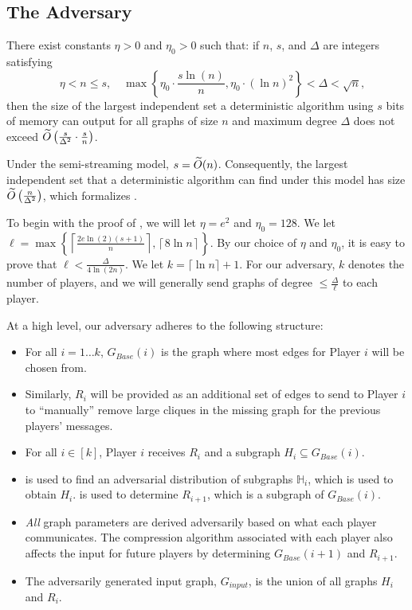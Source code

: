 \documentclass[11pt]{article}
\begin{document}
\subsection{The Adversary}

\begin{theorem}\label{main-theorem}
    There exist constants $\eta>0$ and $\eta_0>0$ such that: if $n$, $s$, and $\Delta$ are integers satisfying
    \[ \quad \eta<n\le s, \quad \max\left\{\eta_0\cdot \frac{s\ln(n)}n, \eta_0\cdot {(\ln n)}^2 \right \}< \Delta < \sqrt n,\]
    then the size of the largest independent set a deterministic algorithm using $s$ bits of memory can output for all graphs of size $n$ and maximum degree $\Delta$ does not exceed $\widetilde{O}\left(\frac s{\Delta^2}\cdot \frac sn\right)$. 
\end{theorem}

Under the semi-streaming model, $s=\widetilde{O}(n)$. Consequently, the largest independent set that a deterministic algorithm can find under this model has size $\widetilde{O}\left(\frac n{\Delta^2}\right)$, which formalizes .

\newcommand{\distribFac}{\ell}

To begin with the proof of , we will let $\eta=e^2$ and $\eta_0=128$. We let ${\distribFac}=\max\left\{\left\lceil\frac{2e\ln(2)(s+1)}n \right\rceil, \left\lceil8\ln n\right\rceil\right\}$. By our choice of $\eta$ and $\eta_0$, it is easy to prove that ${\distribFac}<\frac{\Delta}{4\ln(2n)}$. We let $k=\lceil \ln n\rceil +1$. For our adversary, $k$ denotes the number of players, and we will generally send graphs of degree $\le \frac{\Delta}{\distribFac}$ to each player. 

At a high level, our adversary adheres to the following structure:
\begin{itemize}
    \item For all $i=1\dots k$, $G_{Base}(i)$ is the graph where most edges for Player $i$ will be chosen from.
    \item Similarly, $R_i$ will be provided as an additional set of edges to send to Player $i$ to ``manually'' remove large cliques in the missing graph for the previous players' messages. 
    \item For all $i\in [k]$, Player $i$ receives $R_i$ and a subgraph $H_i\subseteq G_{Base}(i)$. 
    \item {} is used to find an adversarial distribution of subgraphs $\mathbb{H}_i$, which is used to obtain $H_i$.  is used to determine $R_{i+1}$, which is a subgraph of $G_{Base}(i)$.
    \item \textit{All} graph parameters are derived adversarily based on what each player communicates. The compression algorithm associated with each player also affects the input for future players by determining $G_{Base}(i+1)$ and $R_{i+1}$.
    \item The adversarily generated input graph, $G_{input}$, is the union of all graphs $H_i$ and $R_i$. 
\end{itemize}
\end{document}
